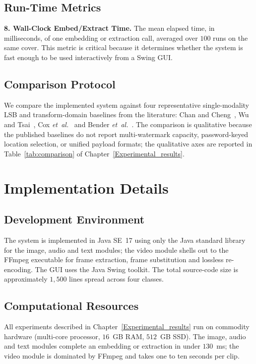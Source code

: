 \subsection{Run-Time Metrics}

\textbf{8. Wall-Clock Embed/Extract Time.} The mean elapsed time, in milliseconds, of one embedding or extraction call, averaged over $100$ runs on the same cover. This metric is critical because it determines whether the system is fast enough to be used interactively from a Swing GUI.

\subsection{Comparison Protocol}

We compare the implemented system against four representative single-modality LSB and transform-domain baselines from the literature: Chan and Cheng~\cite{chan2004hiding}, Wu and Tsai~\cite{wu2003steganography}, Cox \emph{et~al.}~\cite{cox1997secure} and Bender \emph{et~al.}~\cite{bender1996techniques}. The comparison is qualitative because the published baselines do not report multi-watermark capacity, password-keyed location selection, or unified payload formats; the qualitative axes are reported in Table~\ref{tab:comparison} of Chapter~\ref{Experimental_results}.

\section{Implementation Details}
\label{sec:implementation}

\subsection{Development Environment}

The system is implemented in Java SE~17 using only the Java standard library for the image, audio and text modules; the video module shells out to the FFmpeg executable for frame extraction, frame substitution and lossless re-encoding. The GUI uses the Java Swing toolkit. The total source-code size is approximately $1{,}500$ lines spread across four classes.

\subsection{Computational Resources}

All experiments described in Chapter~\ref{Experimental_results} run on commodity hardware (multi-core processor, $16$~GB RAM, $512$~GB SSD). The image, audio and text modules complete an embedding or extraction in under $130$~ms; the video module is dominated by FFmpeg and takes one to ten seconds per clip.

